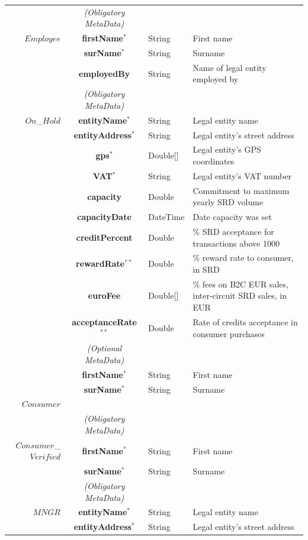 \begin{table}[H]
\begin{centering}
{\begin{tabular}{ r | c | l | l }
\Xhline{1.5pt}
			& \emph{(Obligatory MetaData)} & & \\
\cline{2-2}
$Employee$	& {\bf firstName}$^*$			&String	& First name \\
			& {\bf surName}$^*$			&String	& Surname \\
			& {\bf employedBy}			&String	& Name of legal entity employed by \\
\Xhline{1.5pt}
			& \emph{(Obligatory MetaData)} & & \\
\cline{2-2}
$On$\_$Hold$	& {\bf entityName}$^*$		&String	& Legal entity name \\
			& {\bf entityAddress}$^*$		&String	& Legal entity's street address \\
			& {\bf gps}$^*$				&Double[]	& Legal entity's GPS coordinates \\
			& {\bf VAT}$^*$				&String	& Legal entity's VAT number \\
			& {\bf capacity}				&Double	& Commitment to maximum yearly SRD volume \\
			& {\bf capacityDate}			&DateTime & Date capacity was set \\
			& {\bf creditPercent}			&Double	& \% SRD acceptance for transactions above 1000 \\
			& {\bf rewardRate}$^{**}$		&Double	& \% reward rate to consumer, in SRD \\
			& {\bf euroFee}				&Double[]	& \% fees on B2C EUR sales, inter-circuit SRD sales, in EUR \\			& {\bf acceptanceRate}$^{**}$	&Double	& Rate of credits acceptance in consumer purchases\\
\cline{2-2}
			 & \emph{(Optional MetaData)}& & \\
\cline{2-2}
			& {\bf firstName}$^*$			&String	& First name \\
			& {\bf surName}$^*$			&String	& Surname \\
\Xhline{1.5pt}
$Consumer$	& 	& &  \\
\Xhline{1.5pt}
			& \emph{(Obligatory MetaData)} & & \\
\cline{2-2}
$Consumer$\_$Verified$ & {\bf firstName}$^*$	&String	& First name \\
			& {\bf surName}$^*$			&String	& Surname \\
\Xhline{1.5pt}
			& \emph{(Obligatory MetaData)} & & \\
\cline{2-2}
$MNGR$ 		& {\bf entityName}$^*$		&String	& Legal entity name \\
			& {\bf entityAddress}$^*$		&String	& Legal entity's street address \\

\end{tabular}}
\end{centering}
\end{table}
